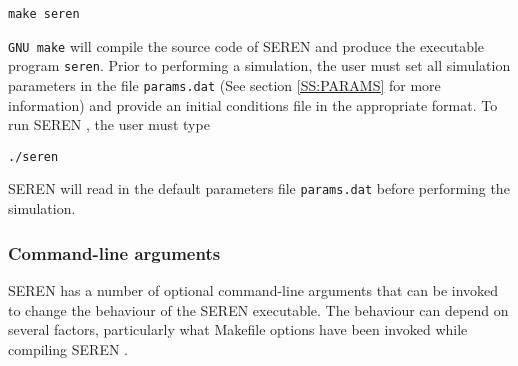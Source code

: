 \documentclass[a4paper]{article}
\newcommand{\NAME}{SEREN }
\newcommand{\var}[1]{\texttt{#1}}
\begin{document}
\var{make seren} \newline

\noindent \var{GNU make} will compile the source code of \NAME and produce the executable program \var{seren}.  Prior to performing a simulation, the user must set all simulation parameters in the file \var{params.dat} (See section \ref{SS:PARAMS} for more information) and provide an initial conditions file in the appropriate format. To run \NAME, the user must type \newline 

\var{./seren} \newline

\noindent \NAME will read in the default parameters file \var{params.dat} before performing the simulation.




\subsubsection{Command-line arguments}
\NAME has a number of optional command-line arguments that can be invoked to change the behaviour of the \NAME executable.  The behaviour can depend on several factors, particularly what Makefile options have been invoked while compiling \NAME.
\end{document}
